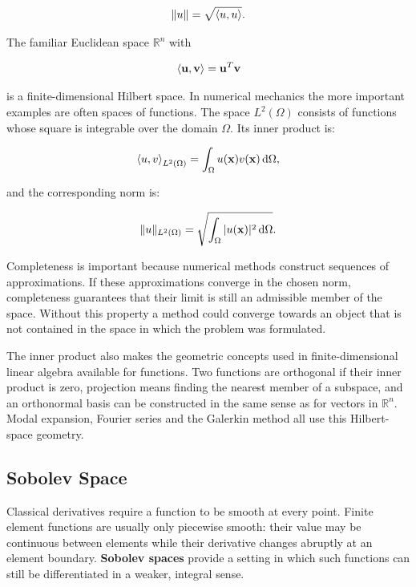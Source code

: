 \begin{equation}\label{hilbert-induced-norm}
    \| {u} \| = \sqrt{\left< u,u \right>}.
\end{equation}

The familiar Euclidean space $ \mathbb{R}^n $ with

\begin{equation}
    \left< \mathbf{u},\mathbf{v} \right> = \mathbf{u}^{T}\mathbf{v}
\end{equation}

is a finite-dimensional Hilbert space. In numerical mechanics the more important
examples are often spaces of functions. The space $ L^2(\Omega) $ consists of
functions whose square is integrable over the domain $ \Omega $. Its inner
product is:

\begin{equation}\label{l2-inner-product}
    \left< u,v \right>_{L^2(\Omega)} =
    \int_{\Omega} u(\mathbf{x})v(\mathbf{x})\,\mathrm{d}\Omega,
\end{equation}

and the corresponding norm is:

\begin{equation}
    \| {u} \|_{L^2(\Omega)} =
    \sqrt{\int_{\Omega} | {u(\mathbf{x})} |^2\,\mathrm{d}\Omega}.
\end{equation}

Completeness is important because numerical methods construct sequences of
approximations. If these approximations converge in the chosen norm, completeness
guarantees that their limit is still an admissible member of the space. Without
this property a method could converge towards an object that is not contained in
the space in which the problem was formulated.

The inner product also makes the geometric concepts used in finite-dimensional
linear algebra available for functions. Two functions are orthogonal if their
inner product is zero, projection means finding the nearest member of a subspace,
and an orthonormal basis can be constructed in the same sense as for vectors in
$ \mathbb{R}^n $. Modal expansion, Fourier series and the Galerkin method all use
this Hilbert-space geometry.

\subsection{Sobolev Space}

Classical derivatives require a function to be smooth at every point. Finite
element functions are usually only piecewise smooth: their value may be
continuous between elements while their derivative changes abruptly at an
element boundary. \textbf{Sobolev spaces} provide a setting in which such
functions can still be differentiated in a weaker, integral sense.

